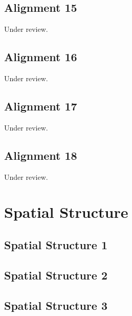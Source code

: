 \documentclass{scrartcl}
\begin{document}
\subsection{Alignment 15} %
\label{sec:align_15}
Under review.%
\clearpage

\subsection{Alignment 16} %
\label{sec:align_16}
Under review.%
\clearpage

\subsection{Alignment 17} %
\label{sec:align_17}
Under review.%
\clearpage

\subsection{Alignment 18} %
\label{sec:align_18}
Under review.%
\clearpage

\section{Spatial Structure}

\subsection{Spatial Structure 1}
\label{sec:spatial_1}
\clearpage

\subsection{Spatial Structure 2}
\label{sec:spatial_2}
\clearpage

\subsection{Spatial Structure 3}
\label{sec:spatial_3}
\clearpage
\end{document}
